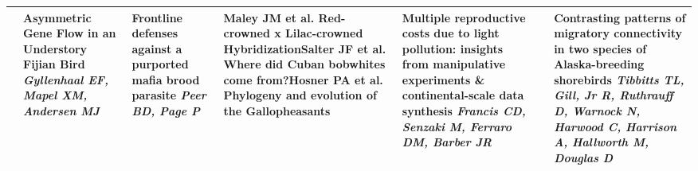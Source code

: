 \begin{tabular}{|x{0.75cm}|x{2.25cm}|x{2.25cm}|x{2.25cm}|a{2.25cm}|a{2.25cm}|a{2.25cm}|}
&Asymmetric Gene Flow in an Understory Fijian Bird \newline \newline \textit{Gyllenhaal EF, Mapel XM, Andersen MJ} & Frontline defenses against a purported mafia brood parasite \newline \newline \textit{Peer BD, Page P} & \scriptsize Maley JM et al. \newline \tiny Red-crowned x Lilac-crowned Hybridization\newline \newline \scriptsize Salter JF et al. \newline \tiny Where did Cuban bobwhites come from?\newline \newline \scriptsize Hosner PA et al. \newline \tiny Phylogeny and evolution of the Gallopheasants & Multiple reproductive costs due to light pollution: insights from manipulative experiments \& continental-scale data synthesis \newline \newline \textit{Francis CD, Senzaki M, Ferraro DM, Barber JR} &  \newline \newline \textit{} & Contrasting patterns of migratory connectivity in two species of Alaska-breeding shorebirds \newline \newline \textit{Tibbitts TL, Gill, Jr R, Ruthrauff D, Warnock N, Harwood C, Harrison A, Hallworth M, Douglas D}\\
\hline

\end{tabular}
